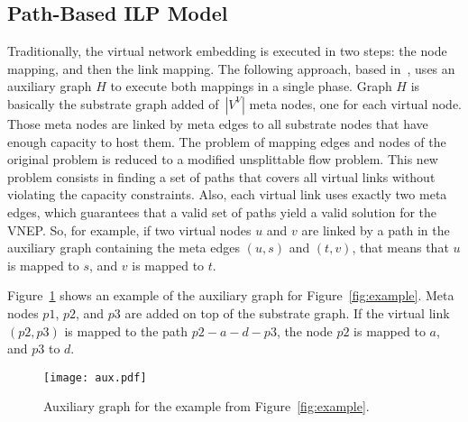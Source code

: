 \documentclass{llncs}
\begin{document}
\subsection{Path-Based ILP Model}
Traditionally, the virtual network embedding is executed in two steps: the node mapping, and then the link mapping. 
The following approach, based in~\cite{Chowdhury2010}, uses an auxiliary graph $H$ to execute both mappings in a single phase. 
Graph $H$ is basically the substrate graph added of~$|V^{V}|$ meta nodes, one for each virtual node. 
Those meta nodes are linked by meta edges to all substrate nodes that have enough capacity to host them. 
The problem of mapping edges and nodes of the original problem is reduced to a modified unsplittable flow problem. 
This new problem consists in finding a set of paths that covers all virtual links without violating the capacity constraints. 
Also, each virtual link uses exactly two meta edges, which guarantees that a valid set of paths yield a valid solution for the VNEP.
So, for example, if two virtual nodes $u$ and $v$ are linked by a path in the auxiliary graph containing the meta edges $(u,s)$ and $(t,v)$, that means that $u$ is mapped to $s$, and $v$ is mapped to $t$.

Figure~\ref{fig:aux} shows an example of the auxiliary graph for Figure~\ref{fig:example}.
Meta nodes $p1$, $p2$, and $p3$ are added on top of the substrate graph. If the virtual link $(p2, p3)$ is mapped to the path $p2-a-d-p3$, the node $p2$ is mapped to $a$, and $p3$ to $d$.

\begin{figure}[h!]
  \centering
  \texttt{[image: aux.pdf]}
  \caption{Auxiliary graph for the example from Figure~\ref{fig:example}.\label{fig:aux}}
\end{figure}
\end{document}
